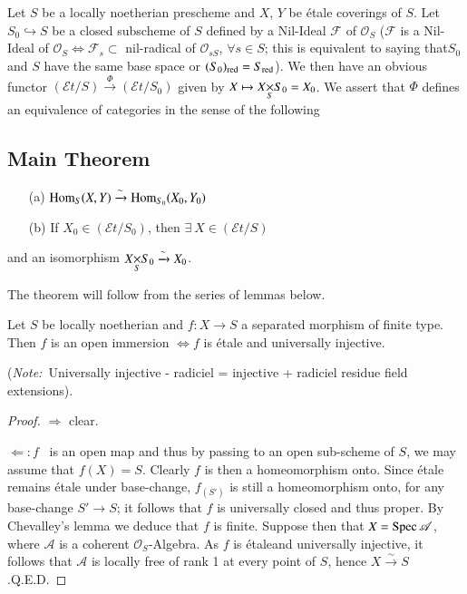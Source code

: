 \section{}\label{chap7-sec7.2}

Let $S$ be a locally noetherian prescheme and $X$, $Y$ be \'etale
coverings of $S$. Let $S_{0}\hookrightarrow S$ be a closed subscheme
of $S$ defined by a Nil-Ideal $\mathscr{F}$ of $\mathscr{O}_{S}$
($\mathscr{F}$ is a Nil-Ideal of $\mathscr{O}_{S}\Leftrightarrow
\mathscr{F}_{s}\subset$ nil-radical of $\mathscr{O}_{sS}$, $\forall
s\in S$; this is equivalent to saying that\pageoriginale $S_{0}$ and
$S$ have the same base space or $(S_{0})_{\operatorname{red}}=S_{\operatorname{red}}$). We then
have an obvious functor
$(\mathscr{E}t/S)\xrightarrow{\Phi}(\mathscr{E}t/S_{0})$ given by
$X\mapsto \fprod{X}{S_{0}}{S}=X_{0}$. We assert that $\Phi$ defines an
equivalence of categories in the sense of the following

\subsection{Main Theorem}\label{chap7-sec7.2.1}
\begin{itemize}
\item[(a)] $\operatorname{Hom}_{S}(X,Y)\xrightarrow{\sim}\operatorname{Hom}_{S_{0}}(X_{0},Y_{0})$

\item[(b)] If $X_{0}\in(\mathscr{E}t/S_{0})$, then $\exists\
  X\in(\mathscr{E}t/S)$ 
\end{itemize}
and an isomorphism $\fprod{X}{S_{0}}{S}\xrightarrow{\sim}X_{0}$. 

The theorem will follow from the series of lemmas below. 

\setcounter{subsection}{1}
\setcounter{sublemma}{0}
\begin{sublemma}\label{chap7-lem7.2.1.1}
Let $S$ be locally noetherian and $f:X\to S$ a separated morphism of
finite type. Then $f$ is an open immersion $\Leftrightarrow f$ is
\'etale and universally injective.
\end{sublemma}

\noindent
({\em Note:}~Universally injective - radiciel = injective + radiciel
residue field extensions).

\begin{proof}
$\Rightarrow$ clear.

$\Leftarrow : f$~ is an open map and thus by passing to an open
  sub-scheme of $S$, we may assume that $f(X)=S$. Clearly $f$ is then
  a homeomorphism onto. Since \'etale remains \'etale under
  base-change, $f_{(S')}$ is still a homeomorphism onto, for any
  base-change $S'\to S$; it follows that $f$ is universally closed and
  thus proper. By Chevalley's lemma we deduce that $f$ is
  finite. Suppose then that $X=\operatorname{Spec} \mathscr{A}$, where $\mathscr{A}$
  is a coherent $\mathscr{O}_{S}$-Algebra. As $f$ is
  \'etale\pageoriginale and universally injective, it follows that
  $\mathscr{A}$ is locally free of rank 1 at every point of $S$, hence
  $X\xrightarrow{\sim}S$.\hfill Q.E.D.
\end{proof}

